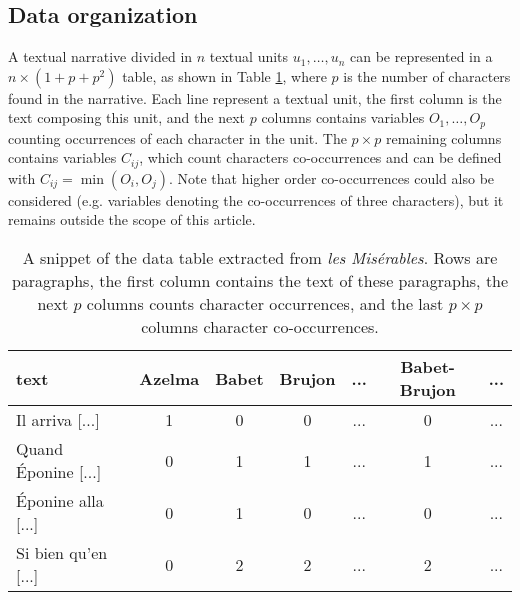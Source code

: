 \documentclass[
twocolumn,
]{ceurart}
\begin{document}
\subsection{Data organization}

A textual narrative divided in $n$ textual units $u_1, \ldots, u_n$ can be represented in a $n \times (1 + p + p^2)$ table, as shown in Table \ref{raw_table}, where $p$ is the number of characters found in the narrative. Each line represent a textual unit, the first column is the text composing this unit, and the next $p$ columns contains variables $O_1, \ldots, O_p$ counting occurrences of each character in the unit. The $p \times p$ remaining columns contains variables $C_{ij}$, which count characters co-occurrences and can be defined with $C_{ij} = \min(O_i, O_j)$. Note that higher order co-occurrences could also be considered (e.g. variables denoting the co-occurrences of three characters), but it remains outside the scope of this article.

\begin{table}[h]
	\tiny
	\begin{tabular}{|l|c|c|c|c|c|c|}
		\hline
		 text & Azelma & Babet & Brujon & ... & Babet-Brujon & ... \\
		 \hline
		 \hline 
		 Il arriva [...] & 1 & 0 & 0 & ... & 0 & ... \\
		 \hline
		 Quand Éponine [...] & 0 & 1 & 1 & ... & 1 & ... \\
		 \hline
		 Éponine alla [...] & 0 & 1 & 0 & ... & 0 & ... \\
		 \hline
		 Si bien qu'en [...] & 0 & 2 & 2 & ... & 2 & ... \\
		 \hline
	\end{tabular}
	\label{raw_table}
	\caption{A snippet of the data table extracted from \emph{les Misérables}. Rows are paragraphs, the first column contains the text of these paragraphs, the next $p$ columns counts character occurrences, and the last $p \times p$ columns character co-occurrences.}
\end{table}
\end{document}
